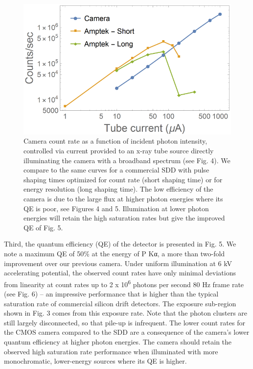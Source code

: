 \begin{figure}[h] \label{cmos26}
\caption{
Camera count rate as a function of incident photon
intensity, controlled via current provided to an x-ray tube source
directly illuminating the camera with a broadband spectrum (see Fig. 4).
We compare to the same curves for a commercial SDD with pulse shaping
times optimized for count rate (short shaping time) or for energy
resolution (long shaping time). The low efficiency of the camera is due
to the large flux at higher photon energies where its QE is poor, see
Figures 4 and 5. Illumination at lower photon energies will retain the
high saturation rates but give the improved QE of Fig. 5.
}
\centering
\includegraphics{NewCameraPaper_1.10.docx1502867018/media/image6.png}
\end{figure}

Third, the quantum efficiency (QE) of the detector is presented in Fig.
5. We note a maximum QE of 50\% at the energy of P Kα, a more than
two-fold improvement over our previous camera. \cite{hoidn2015note} Under
uniform illumination at 6 kV accelerating potential, the observed count
rates have only minimal deviations from linearity at count rates up to 2
x 10\textsuperscript{6} photons per second 80 Hz frame rate (see Fig. 6)
-- an impressive performance that is higher than the typical saturation
rate of commercial silicon drift detectors. The exposure sub-region
shown in Fig. 3 comes from this exposure rate. Note that the photon
clusters are still largely disconnected, so that pile-up is infrequent.
The lower count rates for the CMOS camera compared to the SDD are a
consequence of the camera's lower quantum efficiency at higher photon
energies. The camera should retain the observed high saturation rate
performance when illuminated with more monochromatic, lower-energy
sources where its QE is higher.

